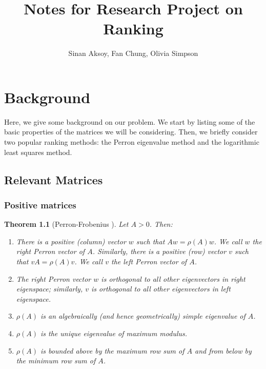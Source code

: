 \documentclass[a4,11pt,twoside,leqno]{report}
\newtheorem{thm}{Theorem}[section]
\theoremstyle{definition}
\theoremstyle{remark}
\numberwithin{equation}{section}
\begin{document}
\title{Notes for Research Project on Ranking}
\author{Sinan Aksoy, Fan Chung, Olivia Simpson}


\maketitle

\tableofcontents


\chapter{Background}

Here, we give some background on our problem. We start by listing some of the basic properties of the matrices we will be considering. Then, we briefly consider two popular ranking methods: the Perron eigenvalue method and the logarithmic least squares method. 

\section{Relevant Matrices}
\subsection{Positive matrices}


\begin{thm}[Perron-Frobenius \cite{analytic} \cite{hornandjohnson}] Let $A>0$. Then:
\begin{enumerate}
\item There is a positive (column) vector $w$ such that $Aw=\rho(A)w$. We call $w$ the {\em right Perron vector} of $A$. Similarly, there is a positive (row) vector $v$ such that $vA=\rho(A)v$. We call $v$ the {\em left Perron vector} of $A$. 
\item The right Perron vector $w$ is orthogonal to all other eigenvectors in right eigenspace; similarly, $v$ is orthogonal to all other eigenvectors in left eigenspace. 
\item $\rho(A)$ is an algebraically (and hence geometrically) simple eigenvalue of $A$. 
\item $\rho(A)$ is the unique eigenvalue of maximum modulus. 
\item $\rho(A)$ is bounded above by the maximum row sum of $A$ and from below by the minimum row sum of $A$. 
\end{enumerate}

\end {thm}
\end{document}
